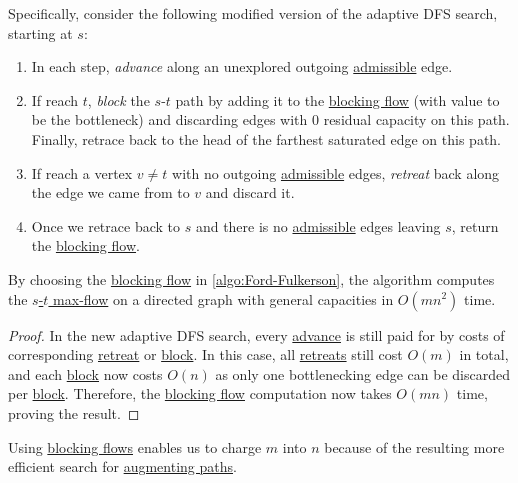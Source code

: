 Specifically, consider the following modified version of the adaptive DFS search, starting at \(s\):
\begin{enumerate}
	\item\label{algo:general-adaptive-DFS-advance} In each step, \emph{advance} along an unexplored outgoing \hyperref[def:admissible]{admissible} edge.
	\item\label{algo:general-adaptive-DFS-block} If reach \(t\), \emph{block} the \(s\)-\(t\) path by adding it to the \hyperref[def:blocking-flow]{blocking flow} (with value to be the bottleneck) and discarding edges with \(0\) residual capacity on this path. Finally, retrace back to the head of the farthest saturated edge on this path.
	\item\label{algo:general-adaptive-DFS-retreat} If reach a vertex \(v \neq t\) with no outgoing \hyperref[def:admissible]{admissible} edges, \emph{retreat} back along the edge we came from to \(v\) and discard it.
	\item Once we retrace back to \(s\) and there is no \hyperref[def:admissible]{admissible} edges leaving \(s\), return the \hyperref[def:blocking-flow]{blocking flow}.
\end{enumerate}

\begin{theorem}\label{thm:Ford-Fulkerson-blocking-flow-general}
	By choosing the \hyperref[def:blocking-flow]{blocking flow} in \autoref{algo:Ford-Fulkerson}, the algorithm computes the \hyperref[prb:s-t-max-flow]{\(s\)-\(t\) max-flow} on a directed graph with general capacities in \(O(mn^2)\) time.
\end{theorem}
\begin{proof}
	In the new adaptive DFS search, every \hyperref[algo:unit-adaptive-DFS-advance]{advance} is still paid for by costs of corresponding \hyperref[algo:unit-adaptive-DFS-retreat]{retreat} or \hyperref[algo:unit-adaptive-DFS-block]{block}. In this case, all \hyperref[algo:general-adaptive-DFS-retreat]{retreats} still cost \(O(m)\) in total, and each \hyperref[algo:general-adaptive-DFS-block]{block} now costs \(O(n)\) as only one bottlenecking edge can be discarded per \hyperref[algo:general-adaptive-DFS-block]{block}. Therefore, the \hyperref[def:blocking-flow]{blocking flow} computation now takes \(O(mn)\) time, proving the result.
\end{proof}

\begin{intuition}
	Using \hyperref[def:blocking-flow]{blocking flows} enables us to charge \(m\) into \(n\) because of the resulting more efficient search for \hyperref[def:augmenting-path]{augmenting paths}.
\end{intuition}

